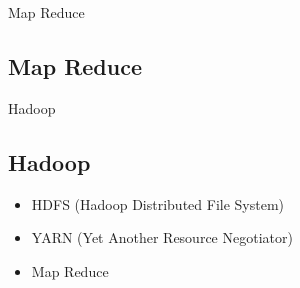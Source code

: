 \documentclass[11pt]{beamer}
\begin{document}
\begin{frame}{Map Reduce}
\subsection{Map Reduce}
\begin{figure}
\end{figure}
\end{frame}

\begin{frame}{Hadoop}
\subsection{Hadoop}
\begin{center}
\begin{figure}
\end{figure}
\end{center}
\begin{itemize}
	\item HDFS (Hadoop Distributed File System)
	\item YARN (Yet Another Resource Negotiator)
	\item Map Reduce
\end{itemize}
\end{frame}
\end{document}
